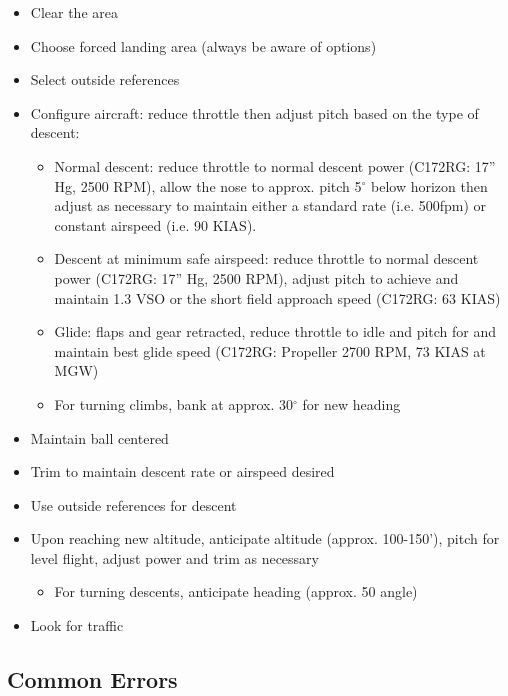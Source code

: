 \begin{itemize}
  \item Clear the area
  \item Choose forced landing area (always be aware of options) 
  \item Select outside references
  \item Configure aircraft: reduce throttle then adjust pitch based on the type
    of descent:
    \begin{itemize}
      \item Normal descent: reduce throttle to normal descent power (C172RG:
        17'' Hg, 2500 RPM), allow the nose to approx. pitch 5$^\circ$ below
        horizon then adjust as necessary to maintain either a standard rate
        (i.e.  500fpm) or constant airspeed (i.e. 90 KIAS). 
      \item Descent at minimum safe airspeed: reduce throttle to normal descent
        power (C172RG: 17'' Hg, 2500 RPM), adjust pitch to achieve and maintain
        1.3 VSO or the short field approach speed (C172RG: 63 KIAS)
      \item Glide: flaps and gear retracted, reduce throttle to idle and pitch
        for and maintain best glide speed (C172RG: Propeller 2700 RPM, 73 KIAS
        at MGW)
      \item For turning climbs, bank at approx. 30$^\circ$ for new heading
    \end{itemize}
  \item Maintain ball centered
  \item Trim to maintain descent rate or airspeed desired
  \item Use outside references for descent
  \item Upon reaching new altitude, anticipate altitude (approx. 100-150'),
    pitch for level flight, adjust power and trim as necessary
    \begin{itemize}
      \item For turning descents, anticipate heading (approx. 50%
        angle)
    \end{itemize}
  \item Look for traffic
\end{itemize}

\subsection{Common Errors}

